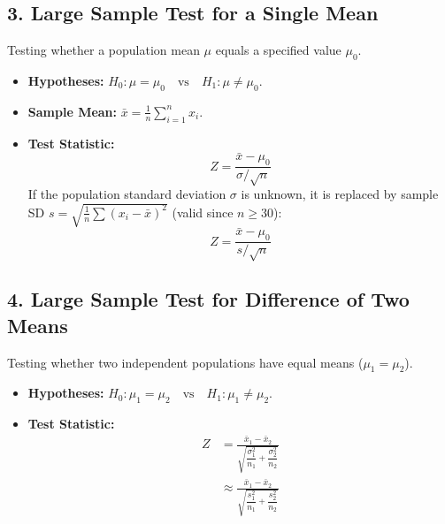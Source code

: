 \documentclass[12pt,a4paper]{article}
\begin{document}
\subsection{3. Large Sample Test for a Single Mean}
Testing whether a population mean $\mu$ equals a specified value $\mu_0$.
\begin{tcolorbox}[formulabox, title={\textbf{Test for Single Mean}}]
\begin{itemize}[leftmargin=*, itemsep=2pt]
  \item \textbf{Hypotheses:} $H_0: \mu = \mu_0 \quad \text{vs} \quad H_1: \mu \ne \mu_0$.
  \item \textbf{Sample Mean:} $\bar{x} = \frac{1}{n} \sum_{i=1}^n x_i$.
  \item \textbf{Test Statistic:}
  \begin{equation}
    Z = \frac{\bar{x} - \mu_0}{\sigma / \sqrt{n}}
  \end{equation}
  If the population standard deviation $\sigma$ is unknown, it is replaced by sample SD $s = \sqrt{\frac{1}{n}\sum(x_i - \bar{x})^2}$ (valid since $n \ge 30$):
  \begin{equation}
    Z = \frac{\bar{x} - \mu_0}{s / \sqrt{n}}
  \end{equation}
\end{itemize}
\end{tcolorbox}

\subsection{4. Large Sample Test for Difference of Two Means}
Testing whether two independent populations have equal means ($\mu_1 = \mu_2$).
\begin{tcolorbox}[formulabox, title={\textbf{Test for Difference of Two Means}}]
\begin{itemize}[leftmargin=*, itemsep=2pt]
  \item \textbf{Hypotheses:} $H_0: \mu_1 = \mu_2 \quad \text{vs} \quad H_1: \mu_1 \ne \mu_2$.
  \item \textbf{Test Statistic:}
  \begin{equation}
    \begin{aligned}
      Z &= \frac{\bar{x}_1 - \bar{x}_2}{\sqrt{\dfrac{\sigma_1^2}{n_1} + \dfrac{\sigma_2^2}{n_2}}} \\[3pt]
      &\approx \frac{\bar{x}_1 - \bar{x}_2}{\sqrt{\dfrac{s_1^2}{n_1} + \dfrac{s_2^2}{n_2}}}
    \end{aligned}
  \end{equation}
\end{itemize}
\end{tcolorbox}
\end{document}
